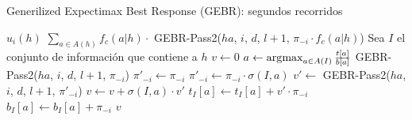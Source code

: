 \begin{algorithm}
\caption{Generilized Expectimax Best Response (GEBR): segundos recorridos}
\label{algorithm:gebr-pass2}
\begin{algorithmic}[1]
            \State \Return $u_i(h)$
            \State \Return $\sum_{a \in A(h)} f_c(a|h) \cdot$ GEBR-Pass2($ha$, $i$, $d$, $l+1$, $\pi_{-i} \cdot f_c(a | h)$)
        \EndIf
        \State Sea $I$ el conjunto de información que contiene a $h$
        \State $v \leftarrow 0$
            \State $a \leftarrow \operatorname*{\arg\!\max}_{a \in A(I)} \frac{t[a]}{b[a]}$
            \State \Return GEBR-Pass2($ha$, $i$, $d$, $l+1$, $\pi_{-i}$)
        \EndIf
            \State $\pi'_{-i} \leftarrow \pi_{-i}$
                \State $\pi'_{-i} \leftarrow \pi_{-i} \cdot \sigma(I, a)$
            \EndIf
            \State $v' \leftarrow $ GEBR-Pass2($ha$, $i$, $d$, $l+1$, $\pi'_{-i}$)
                \State $v \leftarrow v + \sigma(I, a) \cdot v'$
                \State $t_I[a] \leftarrow t_I[a] + v' \cdot \pi_{-i}$
                \State $b_I[a] \leftarrow b_I[a] + \pi_{-i}$
            \EndIf
        \EndFor
        \State \Return $v$
    \EndFunction
\end{algorithmic}
\end{algorithm}





